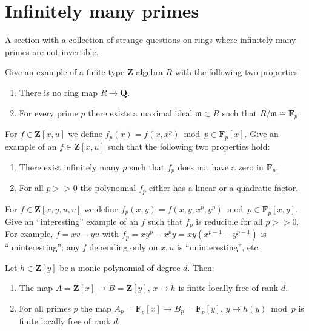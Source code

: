 \section{Infinitely many primes}
\label{section-many-primes}

\noindent
A section with a collection of strange questions on rings where
infinitely many primes are not invertible.

\begin{exercise}
\label{exercise-not-in-Q}
Give an example of a finite type ${\mathbf Z}$-algebra $R$
with the following two properties:
\begin{enumerate}
\item There is no ring map $R \to {\mathbf Q}$.
\item For every prime $p$ there exists a maximal ideal
${\mathfrak m} \subset R$ such that $R/{\mathfrak m} \cong {\mathbf F}_p$.
\end{enumerate}
\end{exercise}

\begin{exercise}
\label{exercise-strange-fp-1}
For $f \in {\mathbf Z}[x, u]$ we define $f_p(x)
= f(x, x^p) \bmod p \in {\mathbf F}_p[x]$. Give an example
of an $f \in {\mathbf Z}[x, u]$ such that the following two
properties hold:
\begin{enumerate}
\item There exist infinitely many $p$ such that $f_p$
does not have a zero in ${\mathbf F}_p$.
\item For all $p >> 0$ the polynomial $f_p$ either has
a linear or a quadratic factor.
\end{enumerate}
\end{exercise}

\begin{exercise}
\label{exercise-strange-fp-2}
For $f \in {\mathbf Z}[x, y, u, v]$ we define $f_p(x, y)
= f(x, y, x^p, y^p) \bmod p \in {\mathbf F}_p[x, y]$. Give an ``interesting''
example of an $f$ such that $f_p$ is reducible for all $p >> 0$.
For example, $f = xv-yu$ with $f_p = xy^p-x^py = xy(x^{p-1}-y^{p-1})$ is
``uninteresting''; any $f$ depending only on $x, u$ is ``uninteresting'',
etc.
\end{exercise}

\begin{remark}
\label{remark-strange-fp}
Let $h \in {\mathbf Z}[y]$ be a monic polynomial of degree $d$.
Then:
\begin{enumerate}
\item The map $A = {\mathbf Z}[x] \to B ={\mathbf Z}[y]$,
$x \mapsto h$ is finite locally free of rank $d$.
\item For all primes $p$ the map
$A_p = {\mathbf F}_p[x]\to B_p = {\mathbf F}_p[y]$,
$y \mapsto h(y) \bmod p$ is finite locally free of rank $d$.
\end{enumerate}
\end{remark}

